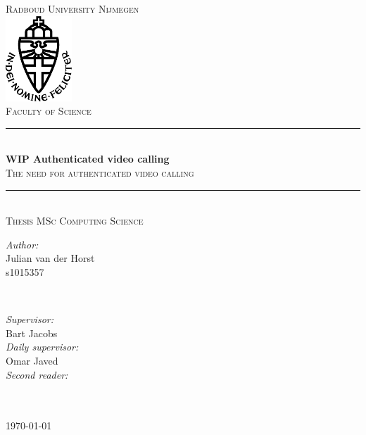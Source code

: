 \documentclass{report}
\title{\thesistitle}
\author{\thesisauthorfirst\space\thesisauthorsecond}
\date{\thesisdate}
\def\thesistitle{WIP Authenticated video calling}
\def\thesissubtitle{The need for authenticated video calling}
\def\thesisauthorfirst{Julian van der Horst \\ s1015357}
\def\thesisauthorsecond{}
\def\thesissupervisorfirst{Bart Jacobs}
\def\thesissupervisorsecond{Omar Javed}
\def\thesissecondreaderfirst{}
\def\thesissecondreadersecond{}
\def\thesisdate{May 2023}
\theoremstyle{definition}
\theoremstyle{remark}
\begin{document}
\begin{titlepage}
	\thispagestyle{empty}
	\newcommand{\HRule}{\rule{\linewidth}{0.5mm}}
	\center
	\textsc{\Large Radboud University Nijmegen}\\[.7cm]
	\includegraphics[width=25mm]{img/in_dei_nomine_feliciter.eps}\\[.5cm]
	\textsc{Faculty of Science}\\[0.5cm]
	
	\HRule \\[0.4cm]
	{ \huge \bfseries \thesistitle}\\[0.1cm]
	\textsc{\thesissubtitle}\\
	\HRule \\[.5cm]
	\textsc{\large Thesis MSc Computing Science}\\[.5cm]
	
	\begin{minipage}{0.4\textwidth}
	\begin{flushleft} \large
	\emph{Author:}\\
	\thesisauthorfirst\space \textsc{\thesisauthorsecond}
	\end{flushleft}
	\end{minipage}
	~
	\begin{minipage}{0.4\textwidth}
	\begin{flushright} \large
	\emph{Supervisor:} \\
	\thesissupervisorfirst  \\[1em]
    \emph{Daily supervisor:} \\
    \thesissupervisorsecond \\[1em]
	\emph{Second reader:} \\
	\thesissecondreaderfirst\\ 
	\end{flushright}
	\end{minipage}\\[4cm]
	\vfill
	{\large \today}\\
	\clearpage
\end{titlepage}

\tableofcontents
\end{document}
